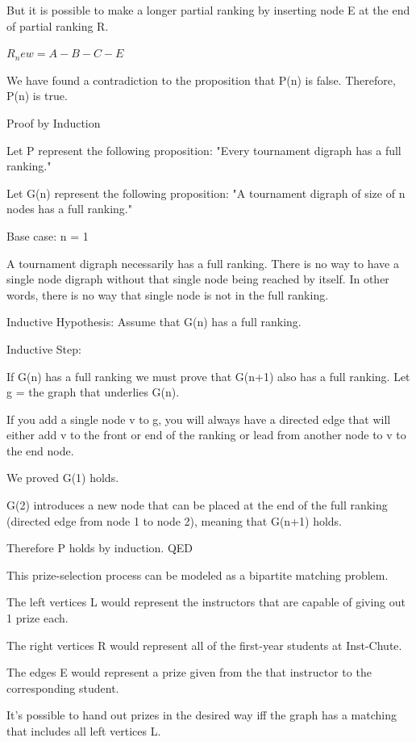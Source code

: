 \documentclass{6042}
\begin{document}
But it is possible to make a longer partial ranking by inserting node E at the end of partial ranking R.

$R_new = A-B-C-E$

We have found a contradiction to the proposition that P(n) is false. Therefore, P(n) is true.


Proof by Induction

Let P represent the following proposition: "Every tournament digraph has a full ranking."

Let G(n) represent the following proposition: "A tournament digraph of size of n nodes has a full ranking."

Base case: n = 1

A tournament digraph necessarily has a full ranking. There is no way to have a single node digraph without that single node being reached by itself. In other words,
there is no way that single node is not in the full ranking.

Inductive Hypothesis: Assume that G(n) has a full ranking.

Inductive Step:

If G(n) has a full ranking we must prove that G(n+1) also has a full ranking. Let g = the graph that underlies G(n).

If you add a single node v to g, you will always have a directed edge that will either add v to the front or end of the ranking or lead from another node to v to the end node.

We proved G(1) holds.

G(2) introduces a new node that can be placed at the end of the full ranking (directed edge from node 1 to node 2), meaning that G(n+1) holds.


Therefore P holds by induction. QED




This prize-selection process can be modeled as a bipartite matching problem.

The left vertices L would represent the instructors that are capable of giving out 1 prize each.

The right vertices R would represent all of the first-year students at Inst-Chute.

The edges E would represent a prize given from the that instructor to the corresponding student.


It's possible to hand out prizes in the desired way iff the graph has a matching that includes all left vertices L.
\end{document}
